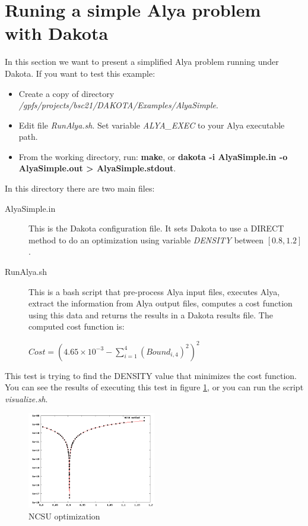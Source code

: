 \documentclass[12pt,a4paper,article]{memoir}
\begin{document}
\section{Runing a simple Alya problem with Dakota}
\label{section:RunSimpleAlya}
In this section we want to present a simplified Alya problem running under Dakota. If you want to test this example:
\begin{itemize}
\item Create a copy of directory \textit{/gpfs/projects/bsc21/DAKOTA/Examples/AlyaSimple}.
\item Edit file \textit{RunAlya.sh}. Set variable \textit{ALYA\_EXEC} to your Alya executable path.
\item From the working directory, run: \textbf{make}, or \textbf{dakota -i AlyaSimple.in -o AlyaSimple.out \textgreater{} AlyaSimple.stdout}.
\end{itemize}

In this directory there are two main files:
\begin{description}
\item[AlyaSimple.in] This is the Dakota configuration file. It sets Dakota to use a DIRECT method to do an optimization using variable \textit{DENSITY} between $[0.8,1.2]$.
\item[RunAlya.sh] This is a bash script that pre-process Alya input files, executes Alya, extract the information from Alya output files, computes a cost function using this data and returns the results in a Dakota results file. The computed cost function is:

$Cost=(4.65\times10^{-3} - \sum\limits_{i=1}^{4}(Bound_{i,4})^2)^2$
\end{description}

This test is trying to find the DENSITY value that minimizes the cost function. You can see the results of executing this test in figure \ref{fig:AlyaSimple}, or you can run the script \textit{visualize.sh}.

\begin{figure}[htb!]
  \centering
    \includegraphics[width=0.5\textwidth]{AlyaSimple}
  \caption{NCSU optimization}
  \label{fig:AlyaSimple}
\end{figure}
\end{document}
